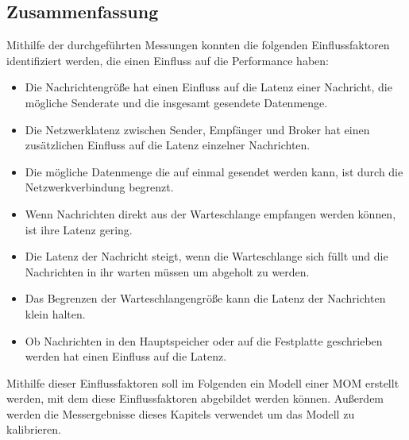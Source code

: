 \subsection{Zusammenfassung}
\label{sec:rmqZusammenfassung}
Mithilfe der durchgeführten Messungen konnten die folgenden Einflussfaktoren identifiziert werden, die einen Einfluss auf die Performance haben:
\begin{itemize}
    \item Die Nachrichtengröße hat einen Einfluss auf die Latenz einer Nachricht, die mögliche Senderate und die insgesamt gesendete Datenmenge.
    \item Die Netzwerklatenz zwischen Sender, Empfänger und Broker hat einen zusätzlichen Einfluss auf die Latenz einzelner Nachrichten.
    \item Die mögliche Datenmenge die auf einmal gesendet werden kann, ist durch die Netzwerkverbindung begrenzt.
    \item Wenn Nachrichten direkt aus der Warteschlange empfangen werden können, ist ihre Latenz gering.
    \item Die Latenz der Nachricht steigt, wenn die Warteschlange sich füllt und die Nachrichten in ihr warten müssen um abgeholt zu werden.
    \item Das Begrenzen der Warteschlangengröße kann die Latenz der Nachrichten klein halten.
    \item Ob Nachrichten in den Hauptspeicher oder auf die Festplatte geschrieben werden hat einen Einfluss auf die Latenz.
\end{itemize}
Mithilfe dieser Einflussfaktoren soll im Folgenden ein Modell einer MOM erstellt werden, mit dem diese Einflussfaktoren abgebildet werden können. Außerdem werden die Messergebnisse dieses Kapitels verwendet um das Modell zu kalibrieren.






